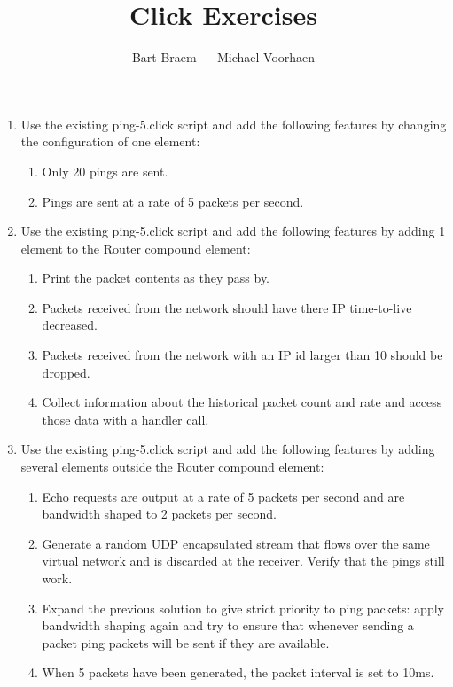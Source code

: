 \documentclass[a4paper]{article}
\author{Bart Braem --- Michael Voorhaen}
\title{Click Exercises}
\date{}
\begin{document}
\maketitle

\begin{enumerate}

\item Use the existing ping-5.click script and add the following features by changing the configuration of one element:

\begin{enumerate}
\item Only 20 pings are sent.
\item Pings are sent at a rate of 5 packets per second.
\end{enumerate}


\item Use the existing ping-5.click script and add the following features by adding 1 element to the Router compound element:

\begin{enumerate}
\item Print the packet contents as they pass by.
\item Packets received from the network should have there IP time-to-live decreased.
\item Packets received from the network with an IP id larger than 10 should be dropped.
\item Collect information about the historical packet count and rate and access those data with a handler call.
\end{enumerate}

\item Use the existing ping-5.click script and add the following features by adding several elements outside the Router compound element:

\begin{enumerate}
\item Echo requests are output at a rate of 5 packets per second and are bandwidth shaped to 2 packets per second.
\item Generate a random UDP encapsulated stream that flows over the same virtual network and is discarded at the receiver. Verify that the pings still work.
\item Expand the previous solution to give strict priority to ping packets: apply bandwidth shaping again and try to ensure that whenever sending a packet ping packets will be sent if they are available.
\item When 5 packets have been generated, the packet interval is set to 10ms.
\end{enumerate}


\end{enumerate}
\end{document}
